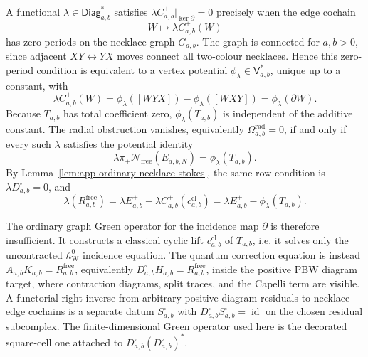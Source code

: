 \begin{rmk}
\label{rmk:app-decorated-hodge-potential-form}
  A functional \(\lambda\in\mathsf{Diag}_{a,b}^{*}\) satisfies
  \(\lambda C^+_{a,b}|_{\ker\partial}=0\) precisely when the edge cochain
  \[
    W\longmapsto \lambda C^+_{a,b}(W)
  \]
  has zero periods on the necklace graph \(G_{a,b}\).  The graph is
  connected for \(a,b>0\), since adjacent \(XY\leftrightarrow YX\)
  moves connect all two-colour necklaces.  Hence this zero-period
  condition is equivalent to a vertex potential
  \(\phi_\lambda\in\mathsf V_{a,b}^{*}\), unique up to a constant, with
  \[
    \lambda C^+_{a,b}(W)
    =
    \phi_\lambda([WYX])-\phi_\lambda([WXY])
    =
    \phi_\lambda(\partial W).
  \]
  Because \(T_{a,b}\) has total coefficient zero, \(\phi_\lambda(T_{a,b})\)
  is independent of the additive constant.  The radial obstruction
  vanishes, equivalently \(\Omega^{\mathrm{rad}}_{a,b}=0\), if and only
  if every such \(\lambda\) satisfies the potential identity
  \[
    \lambda\pi_+\mathcal N_{\mathrm{free}}(E_{a,b,N})
    =
    \phi_\lambda(T_{a,b}).
  \]
  By Lemma~\ref{lem:app-ordinary-necklace-stokes}, the same row condition
  is \(\lambda D^\square_{a,b}=0\), and
  \[
    \lambda(R^{\mathrm{free}}_{a,b})
    =
    \lambda E^+_{a,b}
    -\lambda C^+_{a,b}(c^{\mathrm{cl}}_{a,b})
    =
    \lambda E^+_{a,b}
    -\phi_\lambda(T_{a,b}).
  \]

  The ordinary graph Green operator for the incidence map
  \(\partial\) is therefore insufficient.  It constructs a classical
  cyclic lift \(c^{\mathrm{cl}}_{a,b}\) of \(T_{a,b}\), i.e. it solves
  only the uncontracted \(\hbar_{\mathrm{W}}^0\) incidence equation.  The quantum
  correction equation is instead
  \(A_{a,b}K_{a,b}=R^{\mathrm{free}}_{a,b}\), equivalently
  \(D^\square_{a,b}H_{a,b}=R^{\mathrm{free}}_{a,b}\), inside the positive
  PBW diagram target, where contraction diagrams, split traces, and the
  Capelli term are visible.  A functorial right inverse from arbitrary
  positive diagram residuals to necklace edge cochains is a separate
  datum \(S^{\square}_{a,b}\) with
  \(D^\square_{a,b}S^{\square}_{a,b}=\operatorname{id}\) on the chosen
  residual subcomplex.
  The finite-dimensional Green operator used here is the decorated
  square-cell one attached to
  \(D^\square_{a,b}(D^\square_{a,b})^{*}\).
\end{rmk}

